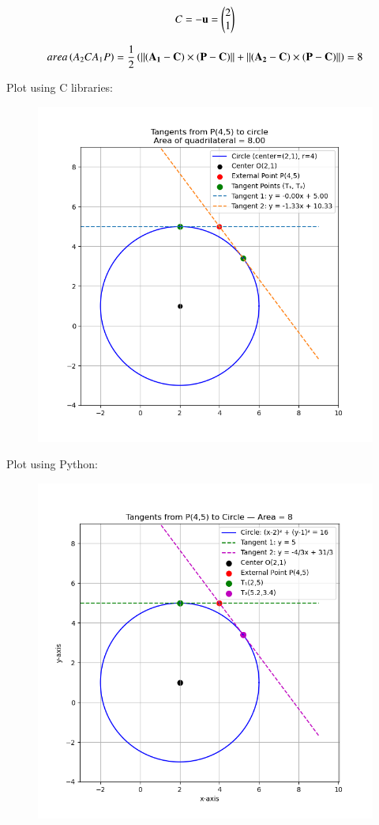 \documentclass[journal,12pt,onecolumn]{IEEEtran}
\begin{document}
\begin{align}
C=-\mathbf{u}=\begin{pmatrix}2\\1\end{pmatrix}
\end{align}

\begin{align}
	area\left(A_2CA_1P\right)=\frac{1}{2}\left(\left\lVert\left(\mathbf{A_1}-\mathbf{C}\right)\times\left(\mathbf{P}-\mathbf{C}\right)\right\rVert+\left\lVert\left(\mathbf{A_2}-\mathbf{C}\right)\times\left(\mathbf{P}-\mathbf{C}\right)\right\rVert\right)=8
\end{align}

Plot using C libraries:
\begin{figure}[H]
	\centering
	\includegraphics[scale=0.5]{img1}
	\caption*{}
	\label{img1}
\end{figure}
Plot using Python:
\begin{figure}[H]
	\centering
	\includegraphics[scale=0.5]{img2}
	\caption*{}
	\label{img2}
\end{figure}
\end{document}
